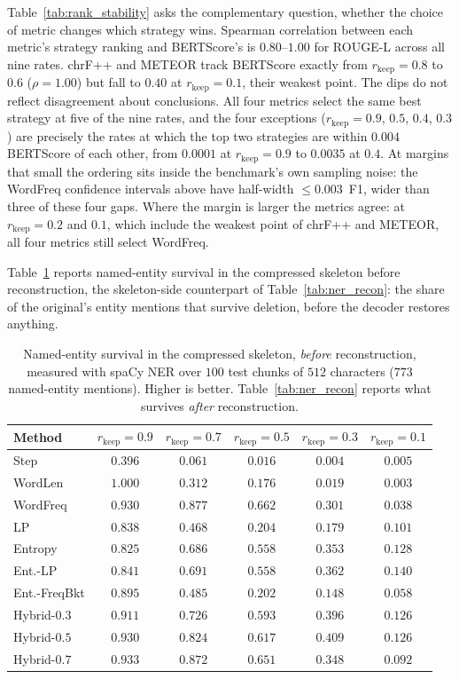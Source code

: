 \documentclass[11pt]{article}
\newcommand{\rkeep}{r_{\mathrm{keep}}}
\begin{document}
Table~\ref{tab:rank_stability} asks the complementary question, whether the choice of metric changes which
strategy wins. Spearman correlation between each metric's strategy ranking and BERTScore's is
$0.80$--$1.00$ for ROUGE-L across all nine rates. chrF++ and METEOR track BERTScore exactly from
$\rkeep = 0.8$ to $0.6$ ($\rho = 1.00$) but fall to $0.40$ at $\rkeep = 0.1$, their weakest point. The dips do not reflect disagreement about conclusions. All four metrics
select the same best strategy at five of the nine rates, and the four exceptions ($\rkeep = 0.9$, $0.5$,
$0.4$, $0.3$) are precisely the rates at which the top two strategies are within $0.004$ BERTScore of each
other, from $0.0001$ at $\rkeep = 0.9$ to $0.0035$ at $0.4$. At margins that small the ordering sits inside
the benchmark's own sampling noise: the WordFreq confidence intervals above have half-width
${\le}0.003$~F1, wider than three of these four gaps. Where the margin is larger the metrics agree: at $\rkeep = 0.2$ and $0.1$, which include the weakest point of chrF++ and METEOR, all four metrics still select WordFreq.

Table~\ref{tab:ner_preservation} reports named-entity survival in the compressed skeleton before reconstruction, the skeleton-side counterpart of Table~\ref{tab:ner_recon}: the share of the original's entity mentions that survive deletion, before the decoder restores anything.

\begin{table}[tbp]
\centering
\caption{Named-entity survival in the compressed skeleton, \emph{before} reconstruction, measured with spaCy NER over $100$ test chunks of $512$ characters ($773$ named-entity mentions). Higher is better. Table~\ref{tab:ner_recon} reports what survives \emph{after} reconstruction.}
\label{tab:ner_preservation}
\small
\setlength{\tabcolsep}{6pt}
\begin{tabular}{lccccc}
\toprule
\textbf{Method} & $\rkeep{=}0.9$ & $\rkeep{=}0.7$ & $\rkeep{=}0.5$ & $\rkeep{=}0.3$ & $\rkeep{=}0.1$ \\
\midrule
Step & $0.396$ & $0.061$ & $0.016$ & $0.004$ & $0.005$ \\
WordLen & $\mathbf{1.000}$ & $0.312$ & $0.176$ & $0.019$ & $0.003$ \\
WordFreq & $0.930$ & $\mathbf{0.877}$ & $\mathbf{0.662}$ & $0.301$ & $0.038$ \\
LP & $0.838$ & $0.468$ & $0.204$ & $0.179$ & $0.101$ \\
Entropy & $0.825$ & $0.686$ & $0.558$ & $0.353$ & $0.128$ \\
Ent.-LP & $0.841$ & $0.691$ & $0.558$ & $0.362$ & $\mathbf{0.140}$ \\
Ent.-FreqBkt & $0.895$ & $0.485$ & $0.202$ & $0.148$ & $0.058$ \\
Hybrid-$0.3$ & $0.911$ & $0.726$ & $0.593$ & $0.396$ & $0.126$ \\
Hybrid-$0.5$ & $0.930$ & $0.824$ & $0.617$ & $\mathbf{0.409}$ & $0.126$ \\
Hybrid-$0.7$ & $0.933$ & $0.872$ & $0.651$ & $0.348$ & $0.092$ \\
\bottomrule
\end{tabular}
\end{table}
\end{document}
